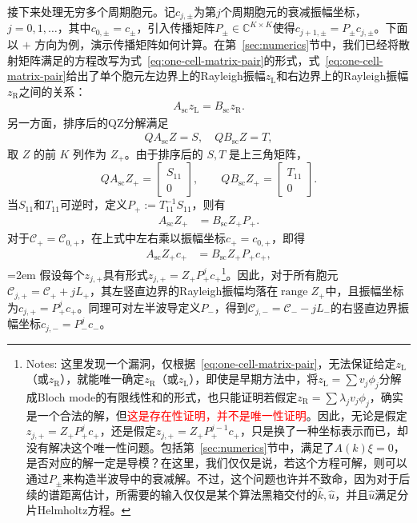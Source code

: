 接下来处理无穷多个周期胞元。记$c_{j,\pm}$为第$j$个周期胞元的衰减振幅坐标，$j=0,1,\ldots$，其中$c_{0,\pm}=c_\pm$，引入传播矩阵$P_\pm \in \mathbb{C}^{K \times K}$使得$c_{j+1,\pm} = P_\pm c_{j,\pm}$。下面以 $+$ 方向为例，演示传播矩阵如何计算。在第~\ref{sec:numerics}节中，我们已经将散射矩阵满足的方程改写为式~\eqref{eq:one-cell-matrix-pair}的形式，式~\eqref{eq:one-cell-matrix-pair}给出了单个胞元左边界上的Rayleigh振幅$z_\mathrm{L}$和右边界上的Rayleigh振幅$z_\mathrm{R}$之间的关系：
\begin{align*}
A_\mathrm{sc} z_\mathrm{L} = B_\mathrm{sc} z_\mathrm{R}. 
\end{align*}
另一方面，排序后的QZ分解满足\begin{align*}
  QA_\mathrm{sc}Z = S,\quad QB_\mathrm{sc}Z = T,
\end{align*}
取 \(Z\) 的前 \(K\) 列作为 \(Z_+\)。由于排序后的 \(S,T\) 是上三角矩阵，
\[
QA_{\mathrm{sc}}Z_+
=\begin{bmatrix}S_{11}\\0\end{bmatrix},
\qquad
QB_{\mathrm{sc}}Z_+
=\begin{bmatrix}T_{11}\\0\end{bmatrix}.
\]
当$S_{11}$和$T_{11}$可逆时，定义$P_+ := T_{11}^{-1}S_{11}$，则有
\begin{align*}
  A_{\mathrm{sc}}Z_+&=B_{\mathrm{sc}}Z_+P_+.
\end{align*}
对于$\mathcal{C}_+ = \mathcal{C}_{0,+}$，在上式中左右乘以振幅坐标$c_+ = c_{0,+}$，即得
\begin{align*}
  A_{\mathrm{sc}}Z_+c_{+}&=B_{\mathrm{sc}}Z_+P_+c_{+},
\end{align*}
\begingroup\emergencystretch=2em
\allowbreak{}\allowbreak 假设每个$z_{j,+}$具有形式$z_{j,+} = Z_+P_+^jc_+$\footnote{
  Notes: 这里发现一个漏洞，仅根据~\eqref{eq:one-cell-matrix-pair}，无法保证给定$z_\mathrm{L}$（或$z_\mathrm{R}$），就能唯一确定$z_\mathrm{R}$（或$z_\mathrm{L}$），即使是早期方法中，将$z_\mathrm{L} = \sum v_j\phi_j$分解成Bloch mode的有限线性和的形式，也只能证明若假定$z_\mathrm{R} = \sum \lambda_jv_j\phi_j$，确实是一个合法的解，但\textcolor{red}{这是存在性证明，并不是唯一性证明}。因此，无论是假定$z_{j,+} = Z_+P_+^jc_+$，还是假定$z_{j,+} = Z_+P_+^{j-1}c_+$，只是换了一种坐标表示而已，却没有解决这个唯一性问题。包括第~\ref{sec:numerics}节中，满足了$A(k)\xi = 0$，是否对应的解一定是导模？在这里，我们仅仅是说，若这个方程可解，则可以通过$P_\pm$来构造半波导中的衰减解。不过，这个问题也许并不致命，因为对于后续的谱距离估计，所需要的输入仅仅是某个算法黑箱交付的$\hat{k}, \hat{u}$，并且$\hat{u}$满足分片Helmholtz方程。
}。因此，对于所有胞元$\mathcal{C}_{j,+} = \mathcal{C}_+ + jL_+$，其左竖直边界的Rayleigh振幅均落在$\operatorname{range}Z_+$中，且振幅坐标为$c_{j,+} = P_+^j c_+$。同理可对左半波导定义$P_-$，得到$\mathcal{C}_{j,-} = \mathcal{C}_- - jL_-$的右竖直边界振幅坐标$c_{j,-} = P_-^j c_-$。
\par\endgroup

